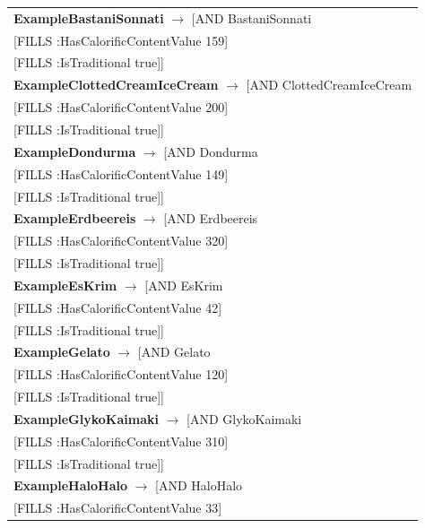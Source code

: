 \documentclass[12pt]{article}
\newcommand*{\MyIndent}{\hspace*{7em}}
\begin{document}
\begin{tabularx}{1\textwidth}{@{}X@{}}
            \textbf{ExampleBastaniSonnati} $\rightarrow$ [AND BastaniSonnati \\
                            \MyIndent [FILLS :HasCalorificContentValue 159] \\
                            \MyIndent [FILLS :IsTraditional true]]
                            \tabularnewline
            \textbf{ExampleClottedCreamIceCream} $\rightarrow$ [AND ClottedCreamIceCream \\
                            \MyIndent [FILLS :HasCalorificContentValue 200] \\
                            \MyIndent [FILLS :IsTraditional true]]
                            \tabularnewline
            \textbf{ExampleDondurma} $\rightarrow$ [AND Dondurma \\
                            \MyIndent [FILLS :HasCalorificContentValue 149] \\
                            \MyIndent [FILLS :IsTraditional true]]
                            \tabularnewline
            \textbf{ExampleErdbeereis} $\rightarrow$ [AND Erdbeereis \\
                            \MyIndent [FILLS :HasCalorificContentValue 320] \\
                            \MyIndent [FILLS :IsTraditional true]]
                            \tabularnewline
            \textbf{ExampleEsKrim} $\rightarrow$ [AND EsKrim \\
                            \MyIndent [FILLS :HasCalorificContentValue 42] \\
                            \MyIndent [FILLS :IsTraditional true]]
                            \tabularnewline
            \textbf{ExampleGelato} $\rightarrow$ [AND Gelato \\
                            \MyIndent [FILLS :HasCalorificContentValue 120] \\
                            \MyIndent [FILLS :IsTraditional true]]
                            \tabularnewline
            \textbf{ExampleGlykoKaimaki} $\rightarrow$ [AND GlykoKaimaki \\
                            \MyIndent [FILLS :HasCalorificContentValue 310] \\
                            \MyIndent [FILLS :IsTraditional true]]
                            \tabularnewline
            \textbf{ExampleHaloHalo} $\rightarrow$ [AND HaloHalo \\
                            \MyIndent [FILLS :HasCalorificContentValue 33] \\

\end{tabularx}
\end{document}

